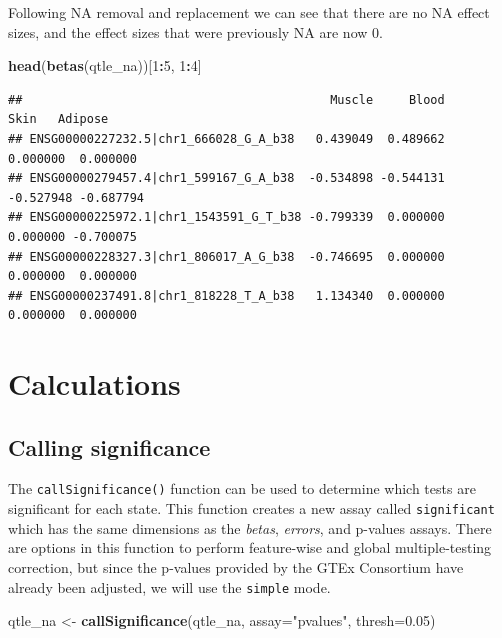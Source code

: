 \documentclass[
]{article}
\newenvironment{Shaded}{\begin{snugshade}}{\end{snugshade}}
\newcommand{\AttributeTok}[1]{\textcolor[rgb]{0.13,0.29,0.53}{#1}}
\newcommand{\DecValTok}[1]{\textcolor[rgb]{0.00,0.00,0.81}{#1}}
\newcommand{\FloatTok}[1]{\textcolor[rgb]{0.00,0.00,0.81}{#1}}
\newcommand{\FunctionTok}[1]{\textcolor[rgb]{0.13,0.29,0.53}{\textbf{#1}}}
\newcommand{\NormalTok}[1]{#1}
\newcommand{\OtherTok}[1]{\textcolor[rgb]{0.56,0.35,0.01}{#1}}
\newcommand{\SpecialCharTok}[1]{\textcolor[rgb]{0.81,0.36,0.00}{\textbf{#1}}}
\newcommand{\StringTok}[1]{\textcolor[rgb]{0.31,0.60,0.02}{#1}}
\begin{document}
Following NA removal and replacement we can see that there are no NA
effect sizes, and the effect sizes that were previously NA are now 0.
\footnotesize

\begin{Shaded}
\begin{Highlighting}[]
\FunctionTok{head}\NormalTok{(}\FunctionTok{betas}\NormalTok{(qtle\_na))[}\DecValTok{1}\SpecialCharTok{:}\DecValTok{5}\NormalTok{, }\DecValTok{1}\SpecialCharTok{:}\DecValTok{4}\NormalTok{]}
\end{Highlighting}
\end{Shaded}

\begin{verbatim}
##                                           Muscle     Blood      Skin   Adipose
## ENSG00000227232.5|chr1_666028_G_A_b38   0.439049  0.489662  0.000000  0.000000
## ENSG00000279457.4|chr1_599167_G_A_b38  -0.534898 -0.544131 -0.527948 -0.687794
## ENSG00000225972.1|chr1_1543591_G_T_b38 -0.799339  0.000000  0.000000 -0.700075
## ENSG00000228327.3|chr1_806017_A_G_b38  -0.746695  0.000000  0.000000  0.000000
## ENSG00000237491.8|chr1_818228_T_A_b38   1.134340  0.000000  0.000000  0.000000
\end{verbatim}

\normalsize

\section{Calculations}\label{calculations}

\subsection{Calling significance}\label{calling-significance}

The \texttt{callSignificance()} function can be used to determine which
tests are significant for each state. This function creates a new assay
called \texttt{significant} which has the same dimensions as the
\emph{betas}, \emph{errors}, and p-values assays. There are options in
this function to perform feature-wise and global multiple-testing
correction, but since the p-values provided by the GTEx Consortium have
already been adjusted, we will use the \texttt{simple} mode.
\footnotesize

\begin{Shaded}
\begin{Highlighting}[]
\NormalTok{qtle\_na }\OtherTok{\textless{}{-}} \FunctionTok{callSignificance}\NormalTok{(qtle\_na, }\AttributeTok{assay=}\StringTok{"pvalues"}\NormalTok{, }\AttributeTok{thresh=}\FloatTok{0.05}\NormalTok{)}
\end{Highlighting}
\end{Shaded}
\end{document}
